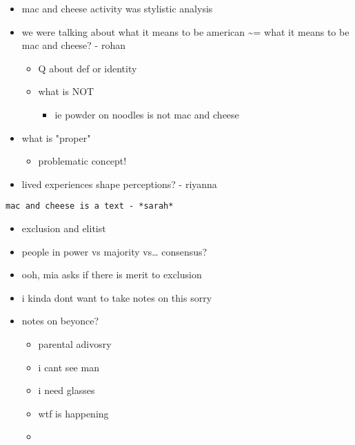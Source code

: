 \documentclass[letterpaper]{article}
\begin{document}
\begin{itemize}
\item mac and cheese activity was stylistic analysis
\item we were talking about what it means to be american \textasciitilde{}= what it means to
be mac and cheese? - rohan

\begin{itemize}
\item Q about def or identity
\item what is NOT

\begin{itemize}
\item ie powder on noodles is not mac and cheese
\end{itemize}
\end{itemize}

\item what is "proper"

\begin{itemize}
\item problematic concept!
\end{itemize}

\item lived experiences shape perceptions? - riyanna
\end{itemize}

\begin{verbatim}
mac and cheese is a text - *sarah*
\end{verbatim}

\begin{itemize}
\item exclusion and elitist

\item people in power vs majority vs\ldots{} consensus?

\item ooh, mia asks if there is merit to exclusion

\item i kinda dont want to take notes on this sorry

\item notes on beyonce?

\begin{itemize}
\item parental adivosry
\item i cant see man
\item i need glasses
\item wtf is happening
\item 
\end{itemize}
\end{itemize}
\end{document}
